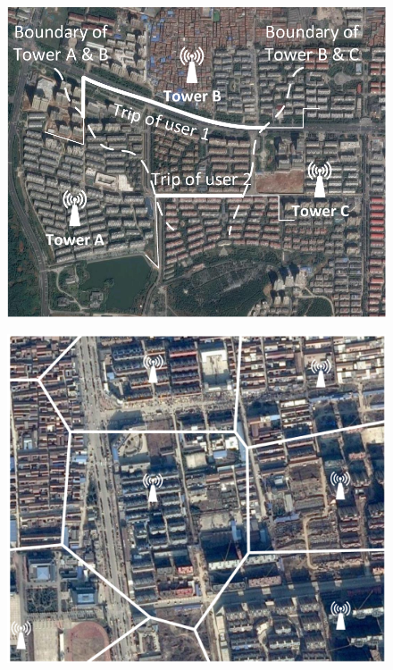 \begin{figure}
\centering
\begin{minipage}{.33\textwidth}
  \centering
  {\includegraphics[width=0.944\linewidth]{./figures/illustrate_cases.pdf}}
  \label{fig:illustrate_cases}
\end{minipage}%
\begin{minipage}{.33\textwidth}
  \centering
  {\includegraphics[width=0.9\linewidth]{./figures/voronoi_illustrate.pdf}}

\end{minipage}
\end{figure}
